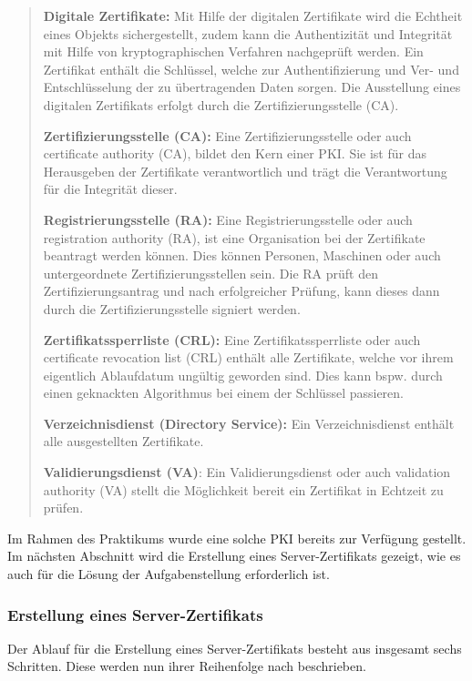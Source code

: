 \documentclass[
a4paper,     %
 headsepline, %
footsepline, %
titlepage,   %
 halfparskip,     %
 fleqn,       %
12pt         %
]{scrartcl}  %
\begin{document}
\begin{quotation}
\item [\textbf{Digitale Zertifikate:}]
Mit Hilfe der digitalen Zertifikate wird die Echtheit eines Objekts sichergestellt, zudem kann die Authentizität und Integrität mit Hilfe von kryptographischen Verfahren nachgeprüft werden. Ein Zertifikat enthält die Schlüssel, welche zur Authentifizierung und Ver- und Entschlüsselung der zu übertragenden Daten sorgen. Die Ausstellung eines digitalen Zertifikats erfolgt durch die Zertifizierungsstelle (CA).
\item [\textbf{Zertifizierungsstelle (CA):}]Eine Zertifizierungsstelle oder auch certificate authority (CA), bildet den Kern einer PKI. Sie ist für das Herausgeben der Zertifikate verantwortlich und trägt die Verantwortung für die Integrität dieser. 
\item [\textbf{Registrierungsstelle (RA):}]Eine Registrierungsstelle oder auch registration authority (RA), ist eine Organisation bei der Zertifikate beantragt werden können. Dies können Personen, Maschinen oder auch untergeordnete Zertifizierungsstellen sein. Die RA prüft den Zertifizierungsantrag und nach erfolgreicher Prüfung, kann dieses dann durch die Zertifizierungsstelle signiert werden. 
\item [\textbf{Zertifikatssperrliste (CRL):}] Eine Zertifikatssperrliste oder auch certificate revocation list (CRL) enthält alle Zertifikate, welche vor ihrem eigentlich Ablaufdatum ungültig geworden sind. Dies kann bspw. durch einen geknackten Algorithmus bei einem der Schlüssel passieren. 
\item [\textbf{Verzeichnisdienst (Directory Service):}] Ein Verzeichnisdienst enthält alle ausgestellten Zertifikate.
\item [\textbf{Validierungsdienst (VA)}:] Ein Validierungsdienst oder auch validation authority (VA) stellt die Möglichkeit bereit ein Zertifikat in Echtzeit zu prüfen. 
\end{quotation}

Im Rahmen des Praktikums wurde eine solche PKI bereits zur Verfügung gestellt. Im nächsten Abschnitt wird die Erstellung eines Server-Zertifikats gezeigt, wie es auch für die Lösung der Aufgabenstellung erforderlich ist. 
\subsubsection{Erstellung eines Server-Zertifikats}
Der Ablauf für die Erstellung eines Server-Zertifikats besteht aus insgesamt sechs Schritten. Diese werden nun ihrer Reihenfolge nach beschrieben. 
\end{document}
